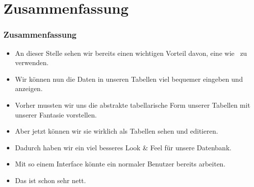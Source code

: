 \documentclass[aspectratio=169,mathserif,notheorems]{beamer}%
\begin{document}
\section{Zusammenfassung}%
%
\begin{frame}%
\frametitle{Zusammenfassung}%
\begin{itemize}%
\item An dieser Stelle sehen wir bereits einen wichtigen Vorteil davon, eine  wie \libreofficeBase\ zu verwenden.%
%
\item<2-> Wir können nun die Daten in unseren Tabellen viel bequemer eingeben und anzeigen.%
%
\item<3-> Vorher mussten wir uns die abstrakte tabellarische Form unserer Tabellen mit unserer Fantasie vorstellen.%
%
\item<4-> Aber jetzt können wir sie wirklich als Tabellen sehen und editieren.%
%
\item<5-> Dadurch haben wir ein viel besseres Look \& Feel für unsere Datenbank.%
%
\item<6-> Mit so einem Interface könnte ein normaler Benutzer bereits arbeiten.%
%
\item<7-> Das ist schon sehr nett.%
\end{itemize}%
\end{frame}%
%
\endPresentation%
\end{document}
